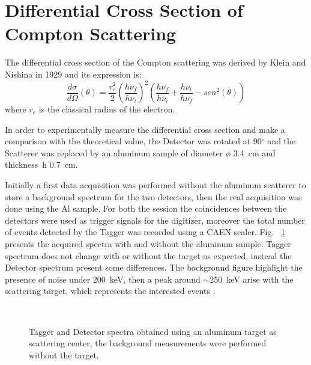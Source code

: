 \newpage
\section*{Differential Cross Section of Compton Scattering}
The differential cross section of the Compton scattering was derived by Klein and Nishina in 1929 and its expression is:
\begin{equation*}
	\frac{d\sigma}{d\Omega}(\theta)=\frac{r_e ^2}{2}\left(\frac{h \nu_f}{h \nu_i}\right)^2\left(\frac{h \nu_f}{h \nu_i}+\frac{h \nu_i}{h \nu_f}-sen^2(\theta)\right)
\end{equation*}
where $r_e$ is the classical radius of the electron.

\medskip

In order to experimentally measure the differential cross section and make a comparison with the theoretical value, the Detector was rotated at 90$^\circ$ and the Scatterer was replaced by an aluminum sample of  diameter $\phi$ 3.4~cm and thickness~h 0.7~cm.  

Initially  a first data acquisition was performed without the aluminum scatterer to store a background spectrum for the two detectors, then the real acquisition was done using the Al sample. For both the session the coincidences between the detectors were used as trigger signals for the digitizer, moreover the total number of events detected by the Tagger was recorded using a CAEN scaler. Fig.~ \ref{Fig:CrossSection_spectra} presents the acquired spectra with and without the aluminum sample. Tagger spectrum does not change with or without the target as expected, instead the Detector spectrum present some differences. The background figure highlight the presence of noise under 200~keV, then a peak around $\sim$250~keV arise with the scattering target, which represents the interested events .

\begin{figure}[h!]
	\centering
	 \quad
	 \quad
	 \quad
	\\
	\caption{Tagger and Detector spectra obtained using an aluminum target as scattering center, the background measurements were performed without the target.}
	\label{Fig:CrossSection_spectra}
\end{figure}
\newpage


